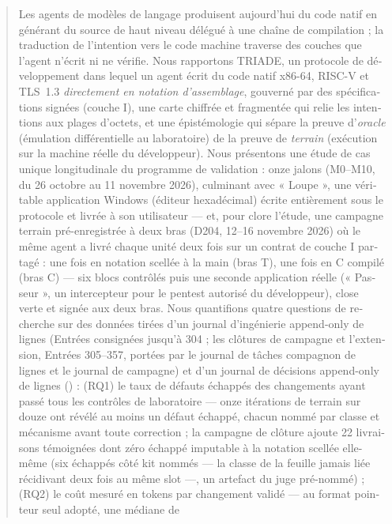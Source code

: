 \documentclass[11pt,a4paper]{article}
\begin{document}
\begin{otherlanguage}{french}
\begin{abstract}
\noindent Les agents de modèles de langage produisent aujourd'hui du code
natif en générant du source de haut niveau délégué à une chaîne de
compilation ; la traduction de l'intention vers le code machine traverse
des couches que l'agent n'écrit ni ne vérifie. Nous rapportons TRIADE, un
protocole de développement dans lequel un agent écrit du code natif
x86-64, RISC-V et TLS~1.3 \emph{directement en notation d'assemblage},
gouverné par des spécifications signées (couche I), une carte chiffrée et
fragmentée qui relie les intentions aux plages d'octets, et une
épistémologie qui sépare la preuve d'\emph{oracle} (émulation
différentielle au laboratoire) de la preuve de \emph{terrain} (exécution
sur la machine réelle du développeur). Nous présentons une étude de cas
unique longitudinale du programme de validation : onze jalons (M0--M10, du
26 octobre au 11 novembre 2026), culminant avec « Loupe », une véritable
application Windows (éditeur hexadécimal) écrite entièrement sous le
protocole et livrée à son utilisateur — et, pour clore l'étude, une
campagne terrain pré-enregistrée à deux bras (D204, 12--16 novembre 2026)
où le même agent a livré chaque unité deux fois sur un contrat de
couche I partagé : une fois en notation scellée à la main (bras T), une
fois en C compilé (bras C) — six blocs contrôlés puis une seconde
application réelle (« Passeur », un intercepteur pour le pentest
autorisé du développeur), close verte et signée aux deux bras. Nous quantifions quatre questions
de recherche sur des données tirées d'un journal d'ingénierie append-only
de \nbLignesJournal{} lignes (Entrées consignées jusqu'à 304 ; les clôtures
de campagne et l'extension, Entrées 305--357, portées par le journal de tâches
compagnon de \nbLignesWorklog{} lignes et le journal de campagne) et d'un
journal de décisions append-only de \nbLignesDecisions{} lignes
(\plageDecisions) : (RQ1) le taux de défauts échappés des changements ayant
passé tous les contrôles de laboratoire — onze itérations de terrain sur
douze ont révélé au moins un défaut échappé, chacun nommé par classe et
mécanisme avant toute correction ; la campagne de clôture ajoute 22
livraisons témoignées dont zéro échappé imputable à la notation
scellée elle-même (six échappés côté kit nommés — la classe de la
feuille jamais liée récidivant deux fois au même slot —, un artefact
du juge pré-nommé) ; (RQ2) le coût mesuré en tokens par
changement validé — au format pointeur seul adopté, une médiane de

\end{abstract}
\end{otherlanguage}
\end{document}
